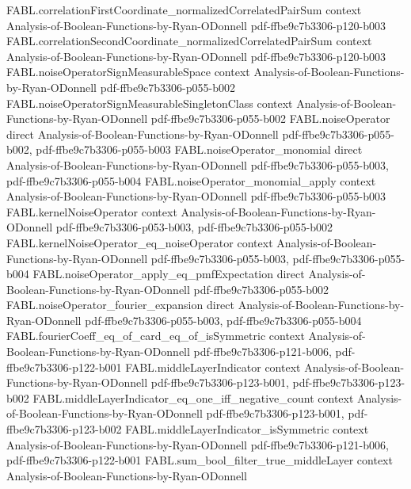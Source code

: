 \begin{theorem}
  {FABL.correlationFirstCoordinate_normalizedCorrelatedPairSum}
  {context}
  {Analysis-of-Boolean-Functions-by-Ryan-ODonnell}
  {pdf-ffbe9c7b3306-p120-b003}
\proofstep
  {FABL.correlationSecondCoordinate_normalizedCorrelatedPairSum}
  {context}
  {Analysis-of-Boolean-Functions-by-Ryan-ODonnell}
  {pdf-ffbe9c7b3306-p120-b003}
\proofstep
  {FABL.noiseOperatorSignMeasurableSpace}
  {context}
  {Analysis-of-Boolean-Functions-by-Ryan-ODonnell}
  {pdf-ffbe9c7b3306-p055-b002}
\proofstep
  {FABL.noiseOperatorSignMeasurableSingletonClass}
  {context}
  {Analysis-of-Boolean-Functions-by-Ryan-ODonnell}
  {pdf-ffbe9c7b3306-p055-b002}
\proofstep
  {FABL.noiseOperator}
  {direct}
  {Analysis-of-Boolean-Functions-by-Ryan-ODonnell}
  {pdf-ffbe9c7b3306-p055-b002,
    pdf-ffbe9c7b3306-p055-b003}
\proofstep
  {FABL.noiseOperator_monomial}
  {direct}
  {Analysis-of-Boolean-Functions-by-Ryan-ODonnell}
  {pdf-ffbe9c7b3306-p055-b003,
    pdf-ffbe9c7b3306-p055-b004}
\proofstep
  {FABL.noiseOperator_monomial_apply}
  {context}
  {Analysis-of-Boolean-Functions-by-Ryan-ODonnell}
  {pdf-ffbe9c7b3306-p055-b003}
\proofstep
  {FABL.kernelNoiseOperator}
  {context}
  {Analysis-of-Boolean-Functions-by-Ryan-ODonnell}
  {pdf-ffbe9c7b3306-p053-b003,
    pdf-ffbe9c7b3306-p055-b002}
\proofstep
  {FABL.kernelNoiseOperator_eq_noiseOperator}
  {context}
  {Analysis-of-Boolean-Functions-by-Ryan-ODonnell}
  {pdf-ffbe9c7b3306-p055-b003,
    pdf-ffbe9c7b3306-p055-b004}
\proofstep
  {FABL.noiseOperator_apply_eq_pmfExpectation}
  {direct}
  {Analysis-of-Boolean-Functions-by-Ryan-ODonnell}
  {pdf-ffbe9c7b3306-p055-b002}
\proofstep
  {FABL.noiseOperator_fourier_expansion}
  {direct}
  {Analysis-of-Boolean-Functions-by-Ryan-ODonnell}
  {pdf-ffbe9c7b3306-p055-b003,
    pdf-ffbe9c7b3306-p055-b004}
\proofstep
  {FABL.fourierCoeff_eq_of_card_eq_of_isSymmetric}
  {context}
  {Analysis-of-Boolean-Functions-by-Ryan-ODonnell}
  {pdf-ffbe9c7b3306-p121-b006,
    pdf-ffbe9c7b3306-p122-b001}
\proofstep
  {FABL.middleLayerIndicator}
  {context}
  {Analysis-of-Boolean-Functions-by-Ryan-ODonnell}
  {pdf-ffbe9c7b3306-p123-b001,
    pdf-ffbe9c7b3306-p123-b002}
\proofstep
  {FABL.middleLayerIndicator_eq_one_iff_negative_count}
  {context}
  {Analysis-of-Boolean-Functions-by-Ryan-ODonnell}
  {pdf-ffbe9c7b3306-p123-b001,
    pdf-ffbe9c7b3306-p123-b002}
\proofstep
  {FABL.middleLayerIndicator_isSymmetric}
  {context}
  {Analysis-of-Boolean-Functions-by-Ryan-ODonnell}
  {pdf-ffbe9c7b3306-p121-b006,
    pdf-ffbe9c7b3306-p122-b001}
\proofstep
  {FABL.sum_bool_filter_true_middleLayer}
  {context}
  {Analysis-of-Boolean-Functions-by-Ryan-ODonnell}

\end{theorem}
